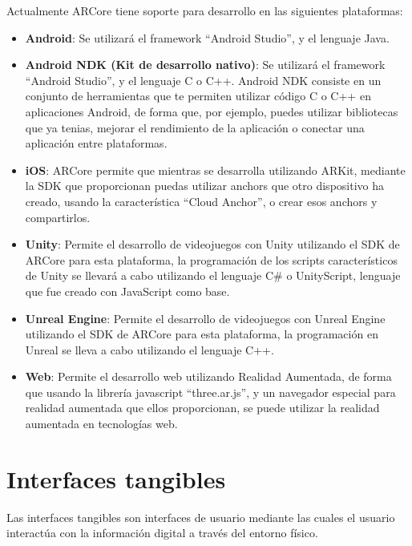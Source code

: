 Actualmente ARCore tiene soporte para desarrollo en las siguientes plataformas:

\begin{itemize}
  \item \textbf{Android}: Se utilizará el framework “Android Studio”, y el lenguaje Java.

  \item \textbf{Android NDK (Kit de desarrollo nativo)}: Se utilizará el framework “Android Studio”, y el lenguaje C o C++. Android NDK consiste en un conjunto de herramientas que te permiten utilizar código C o C++ en aplicaciones Android, de forma que, por ejemplo, puedes utilizar bibliotecas que ya tenias, mejorar el rendimiento de la aplicación o conectar una aplicación entre plataformas. \cite{ndk}

  \item \textbf{iOS}: ARCore permite que mientras se desarrolla utilizando ARKit, mediante la SDK que proporcionan puedas utilizar anchors que otro dispositivo ha creado, usando la característica “Cloud Anchor”, o crear esos anchors y compartirlos.

  \item \textbf{Unity}: Permite el desarrollo de videojuegos con Unity utilizando el SDK de ARCore para esta plataforma, la programación de los scripts característicos de Unity se llevará a cabo utilizando el lenguaje C# o UnityScript, lenguaje que fue creado con JavaScript como base. \cite{unity-scripting}

  \item \textbf{Unreal Engine}: Permite el desarrollo de videojuegos con Unreal Engine utilizando el SDK de ARCore para esta plataforma, la programación en Unreal se lleva a cabo utilizando el lenguaje C++. \cite{unreal}

  \item \textbf{Web}: Permite el desarrollo web utilizando Realidad Aumentada, de forma que usando la librería javascript “three.ar.js”, y un navegador especial para realidad aumentada que ellos proporcionan, se puede utilizar la realidad aumentada en tecnologías web. \cite{arcore-web}
\end{itemize}


\section{Interfaces tangibles}
Las interfaces tangibles son interfaces de usuario mediante las cuales el usuario interactúa con la información digital a través del entorno físico. \cite{ullmer}\\

